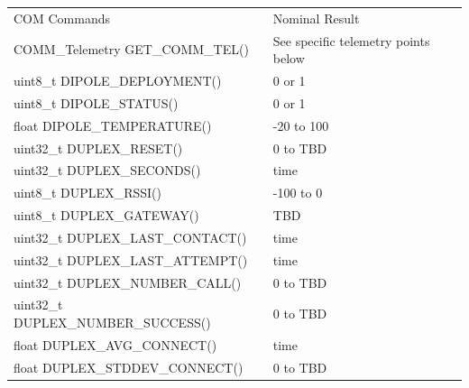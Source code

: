 \documentclass{article}
\begin{document}
\newpage
\begin{tabular}{|l|l|}
	\hline
	COM Commands      &  Nominal Result                \\ \hhline{|=|=|}
	COMM_Telemetry GET_COMM_TEL() & See specific telemetry points below \\ \hline
	uint8_t DIPOLE_DEPLOYMENT() & 0 or 1 \\ \hline
	uint8_t DIPOLE_STATUS() & 0 or 1 \\ \hline
	float DIPOLE_TEMPERATURE() & -20 to 100 \\ \hline
	uint32_t DUPLEX_RESET() & 0 to TBD \\ \hline
	uint32_t DUPLEX_SECONDS() & time \\ \hline
	uint8_t DUPLEX_RSSI() & -100 to 0 \\ \hline
	uint8_t DUPLEX_GATEWAY() & TBD \\ \hline
	uint32_t DUPLEX_LAST_CONTACT() & time \\ \hline
	uint32_t DUPLEX_LAST_ATTEMPT() & time \\ \hline
	uint32_t DUPLEX_NUMBER_CALL() & 0 to TBD \\ \hline
	uint32_t DUPLEX_NUMBER_SUCCESS() & 0 to TBD \\ \hline
	float DUPLEX_AVG_CONNECT() & time \\ \hline
	float DUPLEX_STDDEV_CONNECT()  & 0 to TBD \\ \hline
\end{tabular}
\end{document}
